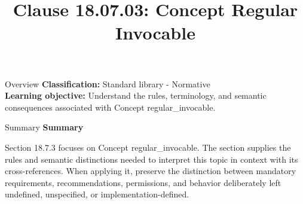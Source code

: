 \documentclass[10pt,letterpaper]{article}
\title{Clause 18.07.03: Concept Regular Invocable}
\author{}
\date{}
\begin{document}
\maketitle
\begin{CornellOverviewBox}{Overview}
\textbf{Classification:} Standard library - Normative\\[2pt]
\textbf{Learning objective:} Understand the rules, terminology, and semantic consequences associated with Concept regular\_invocable.
\end{CornellOverviewBox}\begin{CornellSummaryBox}{Summary}
{\sffamily\bfseries\color{Accent} Summary}\par\vspace{3pt}Section 18.7.3 focuses on Concept regular\_invocable. The section supplies the rules and semantic distinctions needed to interpret this topic in context with its cross-references. When applying it, preserve the distinction between mandatory requirements, recommendations, permissions, and behavior deliberately left undefined, unspecified, or implementation-defined.
\end{CornellSummaryBox}
\end{document}
